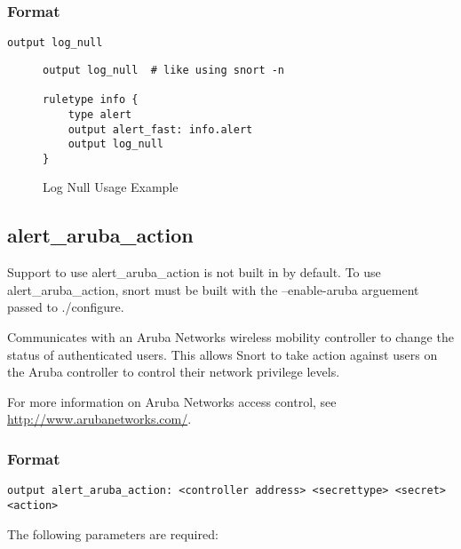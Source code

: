\documentclass[english]{report}
\newenvironment{note}{
\samepage
    \vspace{10pt}{\textsf{
        {\hspace{7pt}\Huge{$\triangle$\hspace{-12.5pt}{\Large{$^!$}}}}\hspace{5pt}
        {\Large{NOTE}}
    }
    }
   \begin{center}
    \par\vspace{-17pt}

    \begin{lrbox}{\savepar}
    \begin{minipage}[r]{6in}
}
{
    \end{minipage}
    \end{lrbox}
    \fbox{
        \usebox{
            \savepar
	}
    }
    \par\vskip10pt
    \end{center}
}
\newenvironment{note}{
        \begin{rawhtml}
        <p><table border="1"><tr><td><b>
        Note:&nbsp;&nbsp;</b>
        \end{rawhtml}
}{
        \begin{rawhtml}
        </b></td></tr></table></p>
        \end{rawhtml}
}
\begin{document}
\subsubsection{Format}

\begin{verbatim}
output log_null
\end{verbatim}
%
\begin{figure}[!hbpt]
\begin{verbatim}
output log_null  # like using snort -n

ruletype info {
    type alert
    output alert_fast: info.alert
    output log_null
}
\end{verbatim}
\caption{Log Null Usage Example\label{log null usage example}}
\end{figure}

\subsection{alert\_aruba\_action}

\begin{note}
Support to use alert\_aruba\_action is not built in by default.  To
use alert\_aruba\_action, snort must be built with the --enable-aruba
arguement passed to ./configure.
\end{note}

Communicates with an Aruba Networks wireless mobility controller to
change the status of authenticated users.  This allows Snort to take
action against users on the Aruba controller to control their network
privilege levels.

For more information on Aruba Networks access control, see
\url{http://www.arubanetworks.com/}.

\subsubsection{Format}

\begin{verbatim}
output alert_aruba_action: <controller address> <secrettype> <secret> <action>
\end{verbatim}
%
The following parameters are required:
\end{document}
